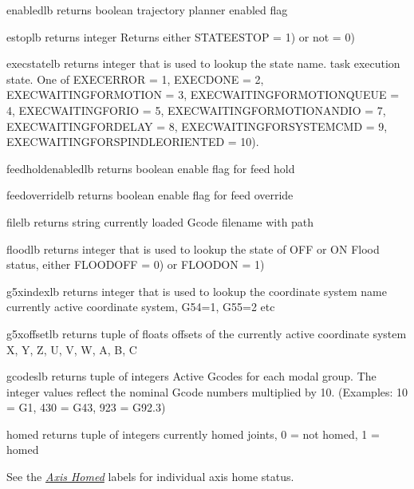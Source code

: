 \documentclass[letterpaper,10pt,english]{sphinxmanual}
\begin{document}
\begin{sphinxVerbatim}[commandchars=\\\{\}]
enabled\PYGZus{}lb \PYGZhy{} returns boolean
trajectory planner enabled flag

estop\PYGZus{}lb \PYGZhy{} returns integer
Returns either STATE\PYGZus{}ESTOP = 1) or not = 0)

exec\PYGZus{}state\PYGZus{}lb \PYGZhy{} returns integer that is used to lookup the state name.
task execution state. One of EXEC\PYGZus{}ERROR = 1, EXEC\PYGZus{}DONE = 2,
EXEC\PYGZus{}WAITING\PYGZus{}FOR\PYGZus{}MOTION = 3, EXEC\PYGZus{}WAITING\PYGZus{}FOR\PYGZus{}MOTION\PYGZus{}QUEUE = 4,
EXEC\PYGZus{}WAITING\PYGZus{}FOR\PYGZus{}IO = 5, EXEC\PYGZus{}WAITING\PYGZus{}FOR\PYGZus{}MOTION\PYGZus{}AND\PYGZus{}IO = 7,
EXEC\PYGZus{}WAITING\PYGZus{}FOR\PYGZus{}DELAY = 8, EXEC\PYGZus{}WAITING\PYGZus{}FOR\PYGZus{}SYSTEM\PYGZus{}CMD = 9,
EXEC\PYGZus{}WAITING\PYGZus{}FOR\PYGZus{}SPINDLE\PYGZus{}ORIENTED = 10).

feed\PYGZus{}hold\PYGZus{}enabled\PYGZus{}lb \PYGZhy{} returns boolean
enable flag for feed hold

feed\PYGZus{}override\PYGZus{}lb \PYGZhy{} returns boolean
 enable flag for feed override

file\PYGZus{}lb \PYGZhy{} returns string
currently loaded G\PYGZhy{}code filename with path

flood\PYGZus{}lb \PYGZhy{} returns integer that is used to lookup the state of OFF or ON
Flood status, either FLOOD\PYGZus{}OFF = 0) or FLOOD\PYGZus{}ON = 1)

g5x\PYGZus{}index\PYGZus{}lb \PYGZhy{} returns integer that is used to lookup the coordinate system name
currently active coordinate system, G54=1, G55=2 etc

g5x\PYGZus{}offset\PYGZus{}lb \PYGZhy{} returns tuple of floats
offsets of the currently active coordinate system X, Y, Z, U, V, W, A, B, C

gcodes\PYGZus{}lb \PYGZhy{} returns tuple of integers
Active G\PYGZhy{}codes for each modal group.
The integer values reflect the nominal G\PYGZhy{}code numbers multiplied by 10.
(Examples: 10 = G1, 430 = G43, 923 = G92.3)

homed \PYGZhy{} returns tuple of integers
currently homed joints, 0 = not homed, 1 = homed
\end{sphinxVerbatim}

\sphinxAtStartPar
See the {\hyperref[\detokenize{labels:axis-homed-labels}]{\emph{Axis Homed}}} labels for individual axis home
status.
\end{document}
